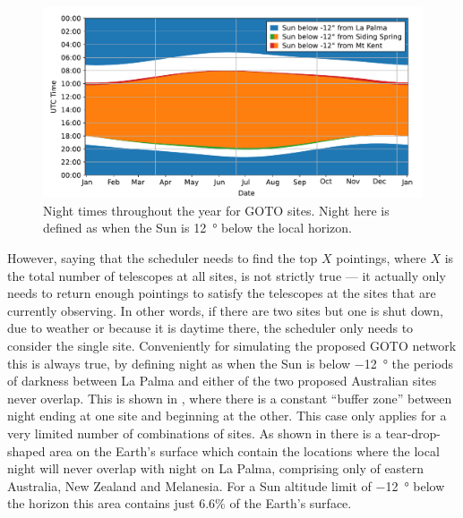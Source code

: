 \begin{colsection}
\begin{colsection}
\newpage

\begin{figure}[t]
    \begin{center}
        \includegraphics[width=\linewidth]{images/nights.pdf}
    \end{center}
    \caption[Night times throughout the year for GOTO sites]{
        Night times throughout the year for GOTO sites. Night here is defined as when the Sun is \SI{12}{\degree} below the local horizon.
    }\label{fig:nights}
\end{figure}

However, saying that the scheduler needs to find the top $X$ pointings, where $X$ is the total number of telescopes at all sites, is not strictly true --- it actually only needs to return enough pointings to satisfy the telescopes at the sites that are currently observing. In other words, if there are two sites but one is shut down, due to weather or because it is daytime there, the scheduler only needs to consider the single site. Conveniently for simulating the proposed GOTO network this is always true, by defining night as when the Sun is below \SI{-12}{\degree} the periods of darkness between La Palma and either of the two proposed Australian sites never overlap. This is shown in , where there is a constant ``buffer zone'' between night ending at one site and beginning at the other. This case only applies for a very limited number of combinations of sites. As shown in  there is a tear-drop-shaped area on the Earth's surface which contain the locations where the local night will never overlap with night on La Palma, comprising only of eastern Australia, New Zealand and Melanesia. For a Sun altitude limit of \SI{-12}{\degree} below the horizon this area contains just $6.6 \%$ of the Earth's surface.


\end{colsection}
\end{colsection}
